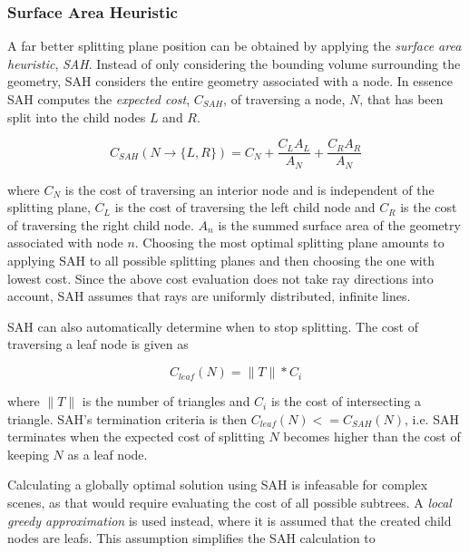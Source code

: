 \subsubsection{Surface Area Heuristic}\label{sec:SAH}


A far better splitting plane position can be obtained by applying the
\textit{surface area heuristic}, \textit{SAH}. Instead of only
considering the bounding volume surrounding the geometry, SAH
considers the entire geometry associated with a node. In essence SAH
computes the \textit{expected cost}, $C_{SAH}$, of traversing a node,
$N$, that has been split into the child nodes $L$ and $R$.

\begin{displaymath}
  C_{SAH}(N \rightarrow \{L, R\}) = C_N + \frac{C_L A_L}{A_N} +
  \frac{C_R A_R}{A_N}
\end{displaymath}

where $C_N$ is the cost of traversing an interior node and is
independent of the splitting plane, $C_L$ is the cost of traversing
the left child node and $C_R$ is the cost of traversing the right
child node. $A_n$ is the summed surface area of the geometry
associated with node $n$. Choosing the most optimal splitting plane
amounts to applying SAH to all possible splitting planes and then
choosing the one with lowest cost. Since the above cost evaluation
does not take ray directions into account, SAH assumes that rays are
uniformly distributed, infinite lines.


SAH can also automatically determine when to stop splitting. The cost
of traversing a leaf node is given as

\begin{displaymath}
  C_{leaf}(N) = \|T\| * C_i
\end{displaymath}

where $\|T\|$ is the number of triangles and $C_i$ is the cost of
intersecting a triangle. SAH's termination criteria is then
$C_{leaf}(N) <= C_{SAH}(N)$, i.e. SAH terminates when the expected
cost of splitting $N$ becomes higher than the cost of keeping $N$ as a
leaf node.

Calculating a globally optimal solution using SAH is infeasable for
complex scenes, as that would require evaluating the cost of all
possible subtrees. A \textit{local greedy approximation} is used
instead, where it is assumed that the created child nodes are
leafs. This assumption simplifies the SAH calculation to

